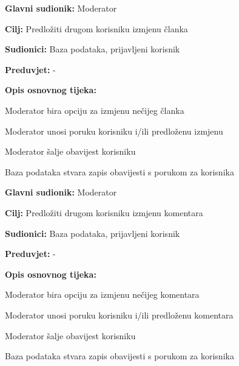 \noindent {}
\begin{packed_item}

\item \textbf{Glavni sudionik:} Moderator
\item  \textbf{Cilj:} Predložiti drugom korisniku izmjenu članka
\item  \textbf{Sudionici:} Baza podataka, prijavljeni korisnik
\item  \textbf{Preduvjet:} -
\item  \textbf{Opis osnovnog tijeka:}

\item[] \begin{packed_enum}

    \item Moderator bira opciju za izmjenu nečijeg članka
    \item Moderator unosi poruku korisniku i/ili predloženu izmjenu
    \item Moderator šalje obavijest korisniku
    \item Baza podataka stvara zapis obavijesti s porukom za korisnika

\end{packed_enum}

\end{packed_item}

\noindent {}
\begin{packed_item}

\item \textbf{Glavni sudionik:} Moderator
\item  \textbf{Cilj:} Predložiti drugom korisniku izmjenu komentara
\item  \textbf{Sudionici:} Baza podataka, prijavljeni korisnik
\item  \textbf{Preduvjet:} -
\item  \textbf{Opis osnovnog tijeka:}

\item[] \begin{packed_enum}

    \item Moderator bira opciju za izmjenu nečijeg komentara
    \item Moderator unosi poruku korisniku i/ili predloženu komentara
    \item Moderator šalje obavijest korisniku
    \item Baza podataka stvara zapis obavijesti s porukom za korisnika

\end{packed_enum}

\end{packed_item}

